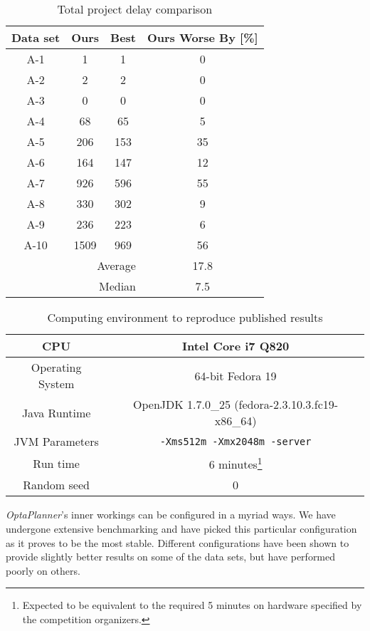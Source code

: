 \documentclass[10pt,a4paper]{article}
\begin{document}
\begin{table}
\caption{Total project delay comparison}
\centering
\begin{tabular}{c||c|c||c}
Data set & Ours & Best & Ours Worse By [\%]\\ 
\hline 
\hline 
A-1 & 1 & 1 & 0\\ 
\hline 
A-2 & 2 & 2 & 0\\ 
\hline 
A-3 & 0 & 0 & 0\\ 
\hline 
A-4 & 68 & 65 & 5\\ 
\hline 
A-5 & 206 & 153 & 35\\ 
\hline 
A-6 & 164 & 147 & 12\\ 
\hline 
A-7 & 926 & 596 & 55\\ 
\hline 
A-8 & 330 & 302 & 9\\ 
\hline 
A-9 & 236 & 223 & 6\\ 
\hline 
A-10 & 1509 & 969 & 56\\
\hline 
\hline 
\multicolumn{3}{r||}{Average} & 17.8 \\ 
\multicolumn{3}{r||}{Median} & 7.5 \\ 
\end{tabular} 
\label{table:comparison}
\end{table}

\begin{table}
\caption{Computing environment to reproduce published results}
\centering
\begin{tabular}{c|c}
CPU & Intel Core i7 Q820\\ 
\hline 
Operating System & 64-bit Fedora 19\\ 
\hline 
Java Runtime & OpenJDK 1.7.0\_25 (fedora-2.3.10.3.fc19-x86\_64)\\ 
\hline 
JVM Parameters & \texttt{-Xms512m -Xmx2048m -server}\\ 
\hline 
Run time & 6 minutes\footnote{Expected to be equivalent to the required 5 minutes on hardware specified by the competition organizers.}\\ 
\hline 
Random seed & 0 
\end{tabular} 
\label{table:env}
\end{table}

\textit{OptaPlanner}'s inner workings can be configured in a myriad ways. We have undergone extensive benchmarking and have picked this particular configuration as it proves to be the most stable. Different configurations have been shown to provide slightly better results on some of the data sets, but have performed poorly on others.
\end{document}

